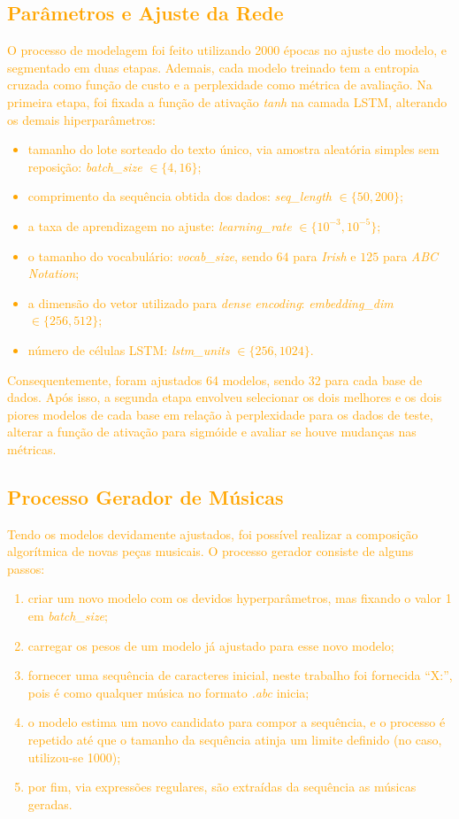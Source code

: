 \documentclass{automatextcc}
\newcommand{\nico}[1]{\textcolor{orange}{#1}}
\begin{document}
\subsection{\nico{Parâmetros e Ajuste da Rede}}
\nico{
O processo de modelagem foi feito utilizando 2000 épocas no ajuste do modelo, e segmentado em duas etapas. Ademais, cada modelo treinado tem a entropia cruzada como função de custo e a perplexidade como métrica de avaliação.  Na primeira etapa, foi fixada a função de ativação \textit{tanh} na camada LSTM, alterando os demais hiperparâmetros: \begin{itemize}
    \item tamanho do lote sorteado do texto único, via amostra aleatória simples sem reposição: \textit{batch\_size} $\in \{4,16\}$;
    \item comprimento da sequência obtida dos dados: \textit{seq\_length} $\in \{50,200\}$;
    \item a taxa de aprendizagem no ajuste: \textit{learning\_rate} $\in \{10^{-3},10^{-5}\}$;
    \item o tamanho do vocabulário: \textit{vocab\_size}, sendo $64$ para \textit{Irish} e $125$ para \textit{ABC Notation};
    \item a dimensão do vetor utilizado para \textit{dense encoding}: \textit{embedding\_dim} $\in \{256,512\}$;
    \item número de células LSTM: \textit{lstm\_units} $\in \{256,1024\}$.
\end{itemize}
Consequentemente, foram ajustados 64 modelos, sendo 32 para cada base de dados. Após isso, a segunda etapa envolveu selecionar os dois melhores e os dois piores modelos de cada base em relação à perplexidade para os dados de teste, alterar a função de ativação para sigmóide e avaliar se houve mudanças nas métricas. 
}
\subsection{\nico{Processo Gerador de Músicas}}
\nico{
Tendo os modelos devidamente ajustados, foi possível realizar a composição algorítmica de novas peças musicais. O processo gerador consiste de alguns passos:
\begin{enumerate}
    \item criar um novo modelo com os devidos hyperparâmetros, mas fixando o valor 1 em \textit{batch\_size}; 
    \item carregar os pesos de um modelo já ajustado para esse novo modelo;
    \item fornecer uma sequência de caracteres inicial, neste trabalho foi fornecida ``X:'', pois é como qualquer música no formato \textit{.abc} inicia;
    \item o modelo estima um novo candidato para compor a sequência, e o processo é repetido até que o tamanho da sequência atinja um limite definido (no caso, utilizou-se 1000);
    \item por fim, via expressões regulares, são extraídas da sequência as músicas geradas.
\end{enumerate}
}
\end{document}
